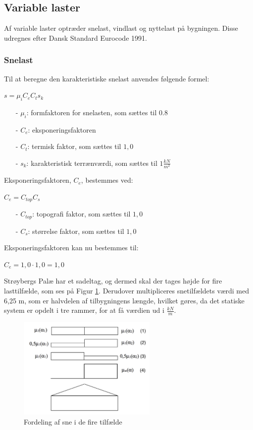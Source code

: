\subsection{Variable laster}
Af variable laster optræder snelast, vindlast og nyttelast på bygningen. Disse udregnes efter Dansk Standard Eurocode 1991.

\subsubsection{Snelast}
Til at beregne den karakteristiske snelast anvendes følgende formel:
\begin{center}
	$s=\mu_iC_eC_ts_k$
\end{center}
\begin{itemize}
	\item[-] $\mu_i$: formfaktoren for snelasten, som sættes til 0.8 \citep[ tabel 5.2 kapitel 5.3]{EU91}
	\item[-] $C_e$: eksponeringsfaktoren
	\item[-] $C_t$: termisk faktor, som sættes til $1,\!0$ \citep[ kapitel 5.2]{EU91}
	\item[-] $s_k$: karakteristisk terrænværdi, som sættes til $1 \frac{kN}{m^2}$ \citep[ kapitel 4.1]{EU91}
\end{itemize}

Eksponeringsfaktoren, $C_e$, bestemmes ved:
\begin{center}
$C_e=C_{top}C_s$
\end{center}
\begin{itemize}
	\item[-] $C_{top}$: topografi faktor, som sættes til $1,\!0$ \citep[ tabel 5.1 kapitel 5.2]{EU91}
	\item[-] $C_s$: størrelse faktor, som sættes til $1,\!0$ \citep[ kapitel 5.2]{EU91}
\end{itemize}
Eksponeringsfaktoren kan nu bestemmes til:
\begin{center}
$C_e=1,\!0\cdot 1,\!0=1,\!0$
\end{center}
Strøybergs Palæ har et sadeltag, og dermed skal der tages højde for fire lasttilfælde, som ses på Figur \ref{fig:sne}. Derudover multipliceres snetilfældets værdi med 6,25 m, som er halvdelen af tilbygningens længde, hvilket gøres, da det statiske system er opdelt i tre rammer, for at få værdien ud i $\frac{kN}{m}$.

\begin{figure}[htbp]
	\centering
	\includegraphics[width=0.6\textwidth]{billeder/snelasttilfaelde.png}
	\caption{Fordeling af sne i de fire tilfælde \citep[ kapitel 5.3.3]{EU91}}
	\label{fig:sne}
\end{figure}

